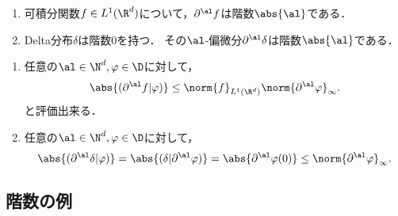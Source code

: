 \documentclass[uplatex,dvipdfmx]{jsreport}
\begin{document}
\begin{example}[微分の階数の一般化である]\mbox{}
    \begin{enumerate}
        \item 可積分関数$f\in L^1(\R^d)$について，$\partial^\al f$は階数$\abs{\al}$である．
        \item Delta分布$\delta$は階数$0$を持つ．
        その$\al$-偏微分$\partial^\al\delta$は階数$\abs{\al}$である．
    \end{enumerate}
\end{example}
\begin{Proof}\mbox{}
    \begin{enumerate}
        \item 任意の$\al\in\N^d,\varphi\in\D$に対して，
        \[\abs{(\partial^\al f|\varphi)}\le\norm{f}_{L^1(\R^d)}\norm{\partial^\al\varphi}_\infty.\]
        と評価出来る．
        \item 任意の$\al\in\N^d,\varphi\in\D$に対して，
        \[\abs{(\partial^\al\delta|\varphi)}=\abs{(\delta|\partial^\al\varphi)}=\abs{\partial^\al\varphi(0)}\le\norm{\partial^\al\varphi}_\infty.\]
    \end{enumerate}
\end{Proof}

\subsection{階数の例}
\end{document}
